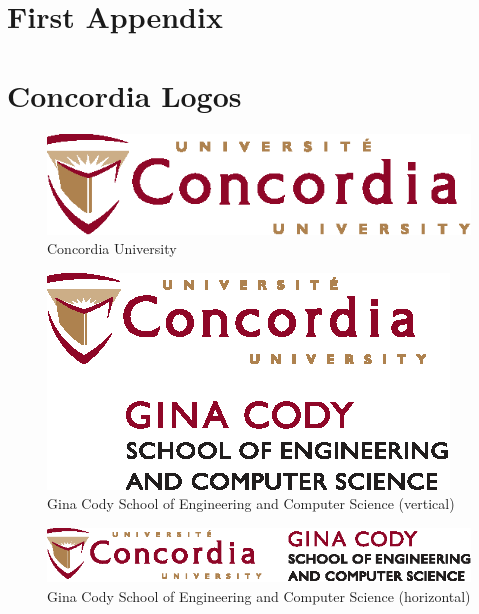 \documentclass[letterpaper,12pt,onecolumn,final]{report}
\begin{document}
\appendix
\setcounter{table}{0}		%
\setcounter{figure}{0}		%
\renewcommand{\thefigure}{\Alph{chapter}.\arabic{figure}} 	%
\renewcommand{\thetable}{\Alph{chapter}.\arabic{table}}		%

\begin{appendices}
\doublespacing

\chapter{First Appendix}
\label{chap:apdx1}

\blindmathpaper

\chapter{Concordia Logos}
\label{chap:logos}
\begin{figure}[h!]
	\centering
	\includegraphics{logos/Concordia_University_logo}
	\caption{Concordia University}
\end{figure}
\vspace{2em}
\begin{figure}[h!]
	\centering
	\includegraphics{logos/Concordia_GinaCody_vertical}
	\caption{Gina Cody School of Engineering and Computer Science (vertical)}
\end{figure}
\vspace{2em}
\begin{figure}[h!]
	\centering
	\includegraphics{logos/Concordia_GinaCody_horizontal}
	\caption{Gina Cody School of Engineering and Computer Science (horizontal)}
\end{figure}

\end{appendices}
\end{document}

